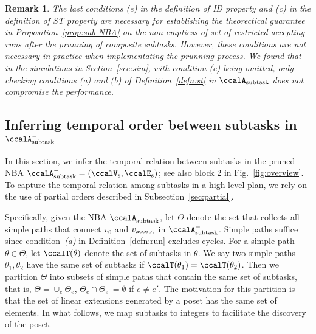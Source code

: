 \documentclass[Afour,sageh,times]{sagej}
\newtheorem{rem}[thm]{Remark}
\newcommand{\auto}[1]{\ccalA_{\textup{#1}}}
\newcommand{\vertex}[1]{v_{\textup{#1}}}
\begin{document}
\begin{rem}
  The last conditions {\it (e)} in the definition of ID property and {\it (c)} in the definition of ST property are necessary for establishing the theorectical guarantee in Proposition~\ref{prop:sub-NBA}  on the non-emptiess of  set of restricted accepting runs after the prunning of composite subtasks. However, these conditions are not necessary in practice when implementating the prunning process. We found that in the simulations in Section~\ref{sec:sim}, with condition {\it (c)} being omitted, only checking conditions {\it (a)} and {\it (b)} of Definition~\ref{defn:st} in $\auto{subtask}$  does not compromise  the performance.
\end{rem}



\subsection{Inferring temporal order between subtasks in  $\auto{subtask}^-$}\label{sec:poset}
In this section,  we infer the temporal relation between subtasks in the pruned NBA $\auto{subtask}^- = (\ccalV_\text{s}, \ccalE_\text{s})$; see also block 2 in Fig.~\ref{fig:overview}.  To capture the temporal relation among subtasks in a high-level plan,  we rely on the use of partial orders described in Subsection~\ref{sec:partial}.


Specifically, given the NBA $\auto{subtask}^-$, let $\Theta$ denote the set that collects all simple paths that connect $v_0$ and $\vertex{accept}$ in $\auto{subtask}^-$. Simple paths suffice since condition~\hyperref[cond:a]{\it (a)} in Definition~\ref{defn:run} excludes cycles. %
For a simple path $\theta \in\Theta$, let $\ccalT(\theta)$ denote the set of subtasks in $\theta$. We say two simple paths $\theta_1, \theta_2$ have the same set of subtasks if $\ccalT(\theta_1) =\ccalT(\theta_2)$. Then we partition $\Theta$ into subsets of  simple paths that contain the same set of subtasks, that is, $\Theta = \cup_e \Theta_e$, $\Theta_e \cap \Theta_{e'} = \emptyset$ if $e\not=e'$. The motivation for this partition is that the set of linear extensions generated by a poset has the same set of elements. {In what follows, we map subtasks to integers to facilitate the discovery of the  poset.}
\end{document}

